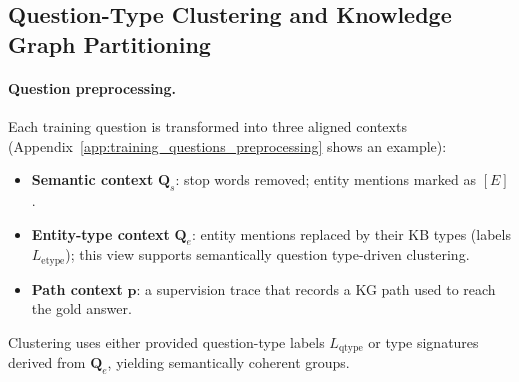 \documentclass[sigconf]{acmart}
\begin{document}
\subsection{Question-Type Clustering and Knowledge Graph Partitioning} \label{text:3-1}


\paragraph{Question preprocessing.}
Each training question is transformed into three aligned contexts
(Appendix~\ref{app:training_questions_preprocessing} shows an example):
\begin{itemize}
    \item \textbf{Semantic context} \(\mathbf{Q}_s\): stop words removed; entity mentions marked as \([E]\).
    \item \textbf{Entity-type context} \(\mathbf{Q}_e\): entity mentions replaced by their KB types (labels \(L_{\text{etype}}\));
          this view supports semantically question type-driven clustering.
    \item \textbf{Path context} \(\mathbf{p}\): a supervision trace that records a KG path used to reach the gold answer.
\end{itemize}
Clustering uses either provided question-type labels \(L_{\text{qtype}}\) or
type signatures derived from \(\mathbf{Q}_e\), yielding semantically coherent groups.


\end{document}
